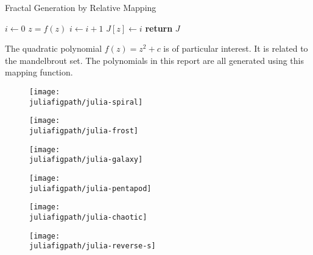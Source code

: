 \documentclass[12pt,a4paper]{article}
\newcommand{\juliafigpath}{../fig/julia}
\begin{document}
    \begin{algorithm}
        \caption{Fractal Generation by Relative Mapping}
        \label{alg:julia}
        \begin{algorithmic}[1]
                    \State $i \gets 0$
                        \State $z = f(z)$
                        \State $i \gets i + 1$
                    \EndWhile
                    \State $J[z] \gets i$
                \EndFor
                \State \textbf{return} $J$
            \EndFunction
        \end{algorithmic}
    \end{algorithm}
    The quadratic polynomial $f(z) = z^2 + c$ is of particular interest. It is related to the mandelbrout set.
    The polynomials in this report are all generated using this mapping function.
    \begin{figure}
        \centering
    \end{figure}
    \begin{figure}
        \centering
        \texttt{[image: \\juliafigpath/julia-spiral]}
    \end{figure}
    \begin{figure}
        \centering
        \texttt{[image: \\juliafigpath/julia-frost]}
    \end{figure}
    \begin{figure}
        \centering
        \texttt{[image: \\juliafigpath/julia-galaxy]}
    \end{figure}
    \begin{figure}
        \centering
        \texttt{[image: \\juliafigpath/julia-pentapod]}
    \end{figure}
    \begin{figure}
        \centering
        \texttt{[image: \\juliafigpath/julia-chaotic]}
    \end{figure}
    \begin{figure}
        \centering
        \texttt{[image: \\juliafigpath/julia-reverse-s]}
    \end{figure}
\end{document}
